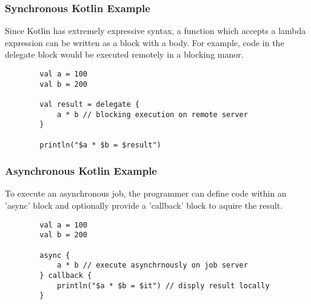 \documentclass[12pt, oneside,english]{article}
\begin{document}
    \subsubsection{Synchronous Kotlin Example}

    Since Kotlin has extremely expressive syntax, a function which accepts a
    lambda expression can be written as a block with a body. For example, code
    in the delegate block would be executed remotely in a blocking manor.

    \begin{lstlisting}
        val a = 100
        val b = 200

        val result = delegate {
            a * b // blocking execution on remote server
        }

        println("$a * $b = $result")
    \end{lstlisting}

    \subsubsection{Asynchronous Kotlin Example}

    To execute an asynchronous job, the programmer can define code within an
    'async' block and optionally provide a 'callback' block to aquire the result.

    \begin{lstlisting}
        val a = 100
        val b = 200

        async {
            a * b // execute asynchrnously on job server
        } callback {
            println("$a * $b = $it") // disply result locally
        }

    \end{lstlisting}
\end{document}
